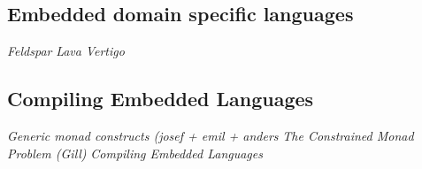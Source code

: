 \documentclass[a4paper]{book}
\begin{document}
\subsection{Embedded domain specific languages} 

\noindent\emph{Feldspar}\citet{FELDSPAR2010} \newline
\noindent\emph{Lava}\citet{lavaICFP} \newline
\noindent\emph{Vertigo}\citet{VERTIGO}  \newline

\subsection{Compiling Embedded Languages}

\noindent\emph{Generic monad constructs (josef + emil + anders}\citet{Generic} \newline
\noindent\emph{The Constrained Monad Problem (Gill)}\citet{sculthorpe2013constrained} \newline
\noindent\emph{Compiling Embedded Languages}\citet{COMPILEEDSL} \newline
\end{document}

